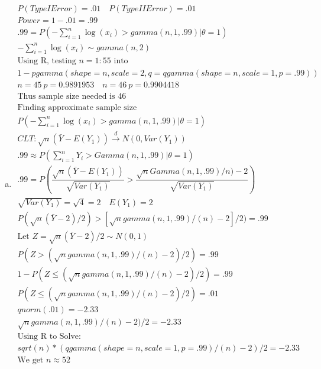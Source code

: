 \documentclass{article}
\newcommand{\cd}{\overset{d}{\to}}
\newcommand{\sumn}{\sum_{i=1}^{n}}
\newcommand{\ta}{\theta}
\begin{document}
\begin{flushleft}
\begin{enumerate}[(a)]
	\item 
\begin{multline*}\\
P(TypeIError)=.01 \quad P(TypeIIError)=.01\\
Power=1-.01=.99\\
.99=P(-\sumn \log(x_i)>gamma(n,1,.99)|\ta=1)\\
-\sumn \log(x_i)\sim gamma(n,2)\\
\text{Using R, testing } n=1:55 \text{ into}\\
1-pgamma(shape=n,scale=2,q=qgamma(shape=n,scale=1,p=.99))\\
n=45 \ p=0.9891953 \quad n=46 \ p=0.9904418\\
\text{Thus sample size needed is } 46\\
\text{Finding approximate sample size}\\
P(-\sumn \log(x_i)>gamma(n,1,.99)|\ta=1)\\
CLT: \sqrt{n}(\bar{Y}-E(Y_1))\cd N(0,Var(Y_1))\\
.99\approx P(\sumn Y_i>Gamma(n,1,.99)|\ta=1)\\
.99=P(\dfrac{\sqrt{n}(\bar{Y}-E(Y_1))}{\sqrt{Var(Y_1)}}>\dfrac{\sqrt{n}Gamma(n,1,.99)/n)-2}{\sqrt{Var(Y_1)}})\\
\sqrt{Var(Y_1)}=\sqrt{4}=2 \quad E(Y_1)=2\\
P(\sqrt{n}(\bar{Y}-2)/2)>[\sqrt{n}gamma(n,1,.99)/(n)-2]/2)=.99\\
\text{Let } Z=\sqrt{n}(\bar{Y}-2)/2\sim N(0,1)\\
P(Z>(\sqrt{n}gamma(n,1,.99)/(n)-2)/2)=.99\\
1-P(Z\leq(\sqrt{n}gamma(n,1,.99)/(n)-2)/2)=.99\\
P(Z\leq(\sqrt{n}gamma(n,1,.99)/(n)-2)/2)=.01\\
qnorm(.01)=-2.33\\
\sqrt{n}gamma(n,1,.99)/(n)-2)/2=-2.33\\
\text{Using R to Solve:}\\ sqrt(n)*(qgamma(shape=n,scale=1,p=.99)/(n)-2)/2=-2.33\\
\text{We get } n\approx 52\\
\end{multline*}


\end{enumerate}
\end{flushleft}
\end{document}
